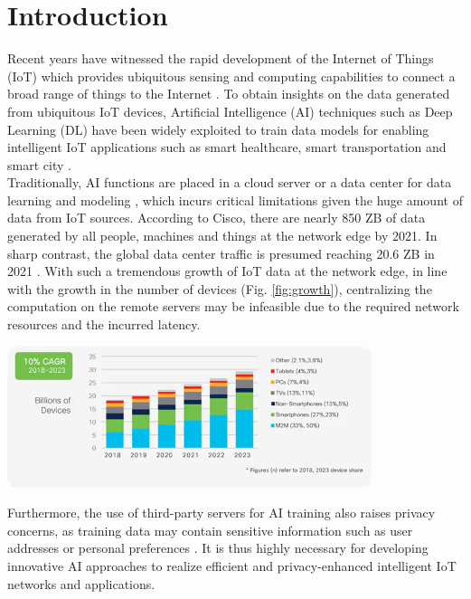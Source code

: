 \chapter{Introduction}

Recent years have witnessed the rapid development of the Internet of Things (IoT) which provides ubiquitous sensing and computing capabilities to connect a broad range of things to the Internet \cite{lin2017survey}. To obtain insights on the data generated from ubiquitous IoT devices, Artificial Intelligence (AI) techniques such as Deep Learning (DL) have been widely exploited to train data models for enabling intelligent IoT applications such as smart healthcare, smart transportation and smart city \cite{mohammadi2018enabling}. \\

Traditionally, AI functions are placed in a cloud server or a data center for data learning and modeling \cite{sun2019application}, which incurs critical limitations given the huge amount of data from IoT sources. According to Cisco, there are nearly 850 ZB of data generated by all people, machines and things at the network edge by 2021. In sharp contrast, the global data center traffic is presumed reaching 20.6 ZB in 2021 \cite{cisco}. With such a tremendous growth of
IoT data at the network edge, in line with the growth in the number of devices (Fig. \ref{fig:growth}), centralizing the computation on the remote servers may be infeasible due to the required network resources and the incurred latency.

\begin{center}
\begin{minipage}[c]{\textwidth}
    \centering
    \includegraphics[width=0.8\textwidth]{contents/Chapter1/growth.png}
    \label{fig:growth}
\end{minipage}
\end{center}

Furthermore, the use of third-party servers for AI training also raises privacy concerns, as training data may contain sensitive information such as user addresses or personal preferences \cite{granjal2015security}. It is thus highly necessary for developing innovative AI approaches to realize efficient and privacy-enhanced intelligent IoT networks and applications. \\

